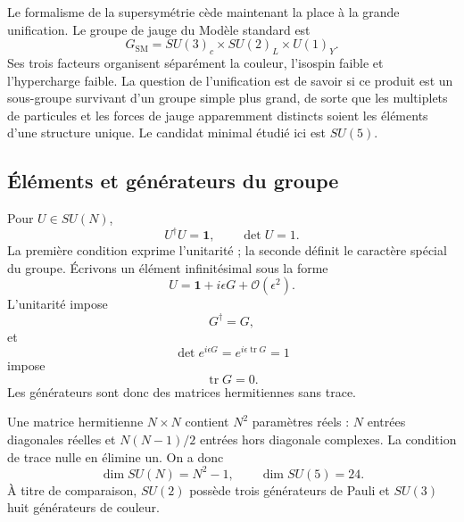 Le formalisme de la supersymétrie cède maintenant la place à la grande unification. Le groupe de jauge du Modèle standard est
\begin{equation}
G_{\mathrm{SM}}
=SU(3)_c\times SU(2)_L\times U(1)_Y.
\label{eq:l9-sm-group}
\end{equation}
Ses trois facteurs organisent séparément la couleur, l’isospin faible et l’hypercharge faible. La question de l’unification est de savoir si ce produit est un sous-groupe survivant d’un groupe simple plus grand, de sorte que les multiplets de particules et les forces de jauge apparemment distincts soient les éléments d’une structure unique. Le candidat minimal étudié ici est \(SU(5)\).

\subsection{Éléments et générateurs du groupe}

Pour \(U\in SU(N)\),
\begin{equation}
U^\dagger U=\mathbf1,
\qquad
\det U=1.
\label{eq:l9-SUN-def}
\end{equation}
La première condition exprime l’unitarité ; la seconde définit le caractère spécial du groupe. Écrivons un élément infinitésimal sous la forme
\begin{equation}
U=\mathbf1+i\epsilon G+\mathcal O(\epsilon^2).
\label{eq:l9-infinitesimal-U}
\end{equation}
L’unitarité impose
\begin{equation}
G^\dagger=G,
\end{equation}
et
\begin{equation}
\det e^{i\epsilon G}
=e^{i\epsilon\operatorname{tr}G}=1
\end{equation}
impose
\begin{equation}
\operatorname{tr}G=0.
\end{equation}
Les générateurs sont donc des matrices hermitiennes sans trace.

Une matrice hermitienne \(N\times N\) contient \(N^2\) paramètres réels : \(N\) entrées diagonales réelles et \(N(N-1)/2\) entrées hors diagonale complexes. La condition de trace nulle en élimine un. On a donc
\begin{equation}
\dim SU(N)=N^2-1,
\qquad
\dim SU(5)=24.
\label{eq:l9-SU5-dimension}
\end{equation}
À titre de comparaison, \(SU(2)\) possède trois générateurs de Pauli et \(SU(3)\) huit générateurs de couleur.

